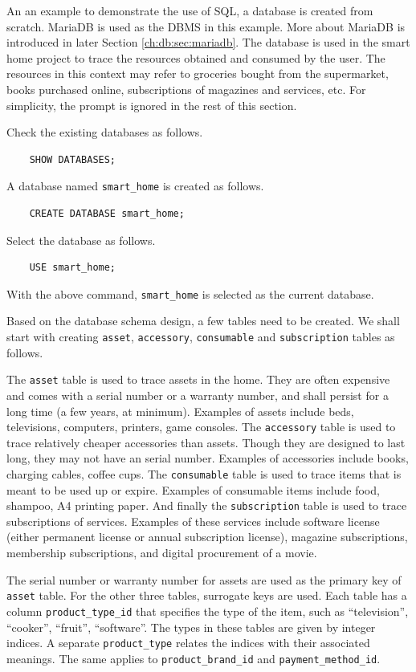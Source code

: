 An an example to demonstrate the use of SQL, a database is created from scratch. MariaDB is used as the DBMS in this example. More about MariaDB is introduced in later Section \ref{ch:db:sec:mariadb}. The database is used in the smart home project to trace the resources obtained and consumed by the user. The resources in this context may refer to groceries bought from the supermarket, books purchased online, subscriptions of magazines and services, etc. For simplicity, the prompt is ignored in the rest of this section.

Check the existing databases as follows.
\begin{lstlisting}
	SHOW DATABASES;
\end{lstlisting}
A database named \verb|smart_home| is created as follows.
\begin{lstlisting}
	CREATE DATABASE smart_home;
\end{lstlisting}
Select the database as follows.
\begin{lstlisting}
	USE smart_home;
\end{lstlisting}
With the above command, \verb|smart_home| is selected as the current database.

Based on the database schema design, a few tables need to be created. We shall start with creating \verb|asset|, \verb|accessory|, \verb|consumable| and \verb|subscription| tables as follows.

The \verb|asset| table is used to trace assets in the home. They are often expensive and comes with a serial number or a warranty number, and shall persist for a long time (a few years, at minimum). Examples of assets include beds, televisions, computers, printers, game consoles. The \verb|accessory| table is used to trace relatively cheaper accessories than assets. Though they are designed to last long, they may not have an serial number. Examples of accessories include books, charging cables, coffee cups. The \verb|consumable| table is used to trace items that is meant to be used up or expire. Examples of consumable items include food, shampoo, A4 printing paper. And finally the \verb|subscription| table is used to trace subscriptions of services. Examples of these services include software license (either permanent license or annual subscription license), magazine subscriptions, membership subscriptions, and digital procurement of a movie.

The serial number or warranty number for assets are used as the primary key of \verb|asset| table. For the other three tables, surrogate keys are used. Each table has a column \verb|product_type_id| that specifies the type of the item, such as ``television'', ``cooker'', ``fruit'', ``software''. The types in these tables are given by integer indices. A separate \verb|product_type| relates the indices with their associated meanings. The same applies to \verb|product_brand_id| and \verb|payment_method_id|.

